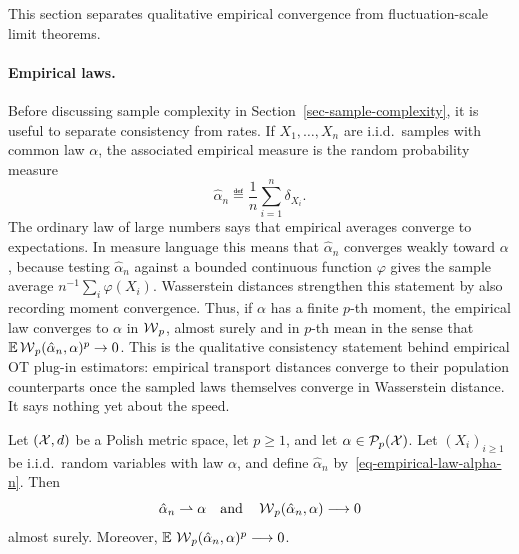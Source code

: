 This section separates qualitative empirical convergence from fluctuation-scale limit theorems.

\paragraph{Empirical laws.}
Before discussing sample complexity in Section~\ref{sec-sample-complexity}, it is useful to separate consistency from rates. If \(X_1,\ldots,X_n\) are i.i.d.\ samples with common law \(\alpha\), the associated empirical measure is the random probability measure
\begin{equation}\label{eq-empirical-law-alpha-n}
	\hat\alpha_n \eqdef \frac1n\sum_{i=1}^n\delta_{X_i}.
\end{equation}
The ordinary law of large numbers says that empirical averages converge to expectations. In measure language this means that \(\hat\alpha_n\) converges weakly toward \(\alpha\), because testing \(\hat\alpha_n\) against a bounded continuous function \(\varphi\) gives the sample average \(n^{-1}\sum_i\varphi(X_i)\). Wasserstein distances strengthen this statement by also recording moment convergence. Thus, if \(\alpha\) has a finite \(p\)-th moment, the empirical law converges to \(\alpha\) in \(\operatorname{\mathcal{W}}_p\), almost surely and in \(p\)-th mean in the sense that \(\mathbb{E}\operatorname{\mathcal{W}}_p(\hat\alpha_n,\alpha)^p\to0\). This is the qualitative consistency statement behind empirical OT plug-in estimators: empirical transport distances converge to their population counterparts once the sampled laws themselves converge in Wasserstein distance. It says nothing yet about the speed.

\begin{prop}\label{prop-empirical-lln-wasserstein}
	Let \((\mathcal{X},d)\) be a Polish metric space, let \(p\geq1\), and let \(\alpha\in\mathcal{P}_p(\mathcal{X})\). Let \((X_i)_{i\geq1}\) be i.i.d.\ random variables with law \(\alpha\), and define \(\hat\alpha_n\) by~\eqref{eq-empirical-law-alpha-n}. Then
	\[
		\hat\alpha_n\rightharpoonup\alpha
		\quad \text{and} \quad
		\operatorname{\mathcal{W}}_p(\hat\alpha_n,\alpha)\longrightarrow0
	\]
	almost surely. Moreover,
	$\mathbb{E}\,\operatorname{\mathcal{W}}_p(\hat\alpha_n,\alpha)^p\longrightarrow0$.
\end{prop}

